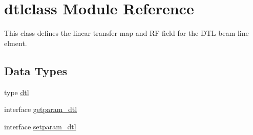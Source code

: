 \hypertarget{namespacedtlclass}{}\section{dtlclass Module Reference}
\label{namespacedtlclass}


This class defines the linear transfer map and RF field for the D\+TL beam line elment.  


\subsection*{Data Types}
\begin{DoxyCompactItemize}
\item 
type \mbox{\hyperlink{namespacedtlclass_structdtlclass_1_1dtl}{dtl}}
\item 
interface \mbox{\hyperlink{interfacedtlclass_1_1getparam__dtl}{getparam\+\_\+dtl}}
\item 
interface \mbox{\hyperlink{interfacedtlclass_1_1setparam__dtl}{setparam\+\_\+dtl}}
\end{DoxyCompactItemize}
